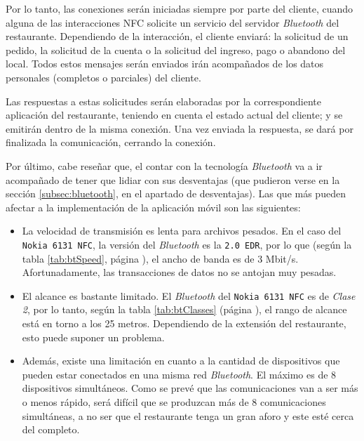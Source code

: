 Por lo tanto, las conexiones serán iniciadas siempre por parte del cliente, 
cuando alguna de las interacciones \acs{NFC} solicite un servicio del
servidor \emph{Bluetooth} del restaurante. Dependiendo de la interacción, el 
cliente enviará: la solicitud de un pedido, la solicitud de la cuenta o la 
solicitud del ingreso, pago o abandono del local. Todos estos mensajes serán 
enviados irán acompañados de los datos personales (completos o parciales) del 
cliente.

Las respuestas a estas solicitudes serán elaboradas por la correspondiente 
aplicación del restaurante, teniendo en cuenta el estado actual del cliente; y 
se emitirán dentro de la misma conexión. Una vez enviada la respuesta, se
dará por finalizada la comunicación, cerrando la conexión.

Por último, cabe reseñar que, el contar con la tecnología \emph{Bluetooth} va
a ir acompañado de tener que lidiar con sus desventajas (que pudieron verse en 
la sección \ref{subsec:bluetooth}, en el apartado de desventajas). Las que
más pueden afectar a la implementación de la aplicación móvil son las 
siguientes:
\begin{itemize}
\item La velocidad de transmisión es lenta para archivos pesados. En el
caso del \texttt{Nokia 6131 \acs{NFC}}, la versión del \emph{Bluetooth} es
la \texttt{2.0 EDR}, por lo que (según la tabla \ref{tab:btSpeed}, página
\pageref{tab:btSpeed}), el ancho de banda es de 3 Mbit/s. Afortunadamente, las
transacciones de datos no se antojan muy pesadas.
\item El alcance es bastante limitado. El \emph{Bluetooth} del
\texttt{Nokia 6131 \acs{NFC}} es de \emph{Clase 2}, por lo tanto, según
la tabla \ref{tab:btClasses} (página \pageref{tab:btClasses}), el rango
de alcance está en torno a los 25 metros. Dependiendo de la extensión del
restaurante, esto puede suponer un problema.
\item Además, existe una limitación en cuanto a la cantidad de dispositivos 
que pueden estar conectados en una misma red \emph{Bluetooth}. El máximo es de 
8 dispositivos simultáneos. Como se prevé que las comunicaciones van a ser
más o menos rápido, será difícil que se produzcan más de 8 comunicaciones
simultáneas, a no ser que el restaurante tenga un gran aforo y este esté cerca
del completo.
\end{itemize}


